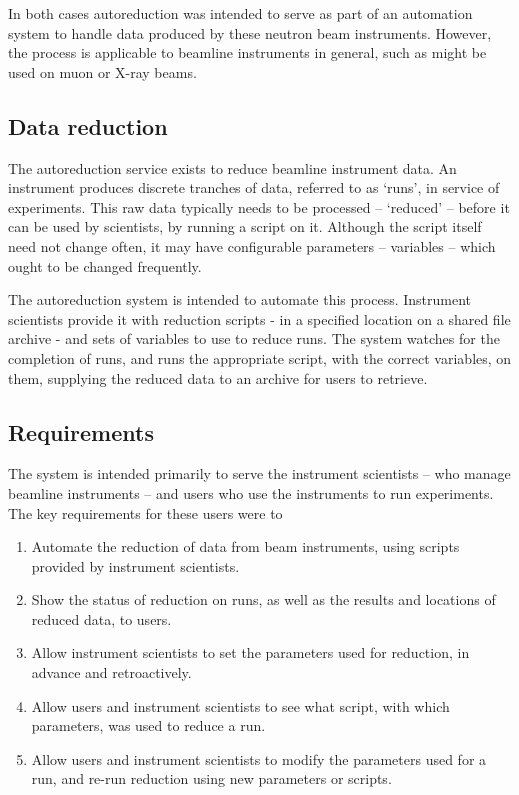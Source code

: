\documentclass[twocolumn]{article}
\begin{document}
In both cases autoreduction was intended to serve as part of an
automation system to handle data produced by these neutron beam
instruments. However, the process is applicable to beamline instruments
in general, such as might be used on muon or X-ray beams.

\subsection{Data reduction}\label{data-reduction}

The autoreduction service exists to reduce beamline instrument data. An
instrument produces discrete tranches of data, referred to as `runs', in
service of experiments. This raw data typically needs to be processed --
`reduced' -- before it can be used by scientists, by running a script on
it. Although the script itself need not change often, it may have
configurable parameters -- variables -- which ought to be changed
frequently.

The autoreduction system is intended to automate this process.
Instrument scientists provide it with reduction scripts - in a specified
location on a shared file archive - and sets of variables to use to
reduce runs. The system watches for the completion of runs, and runs the
appropriate script, with the correct variables, on them, supplying the
reduced data to an archive for users to retrieve.

\subsection{Requirements}\label{requirements}

The system is intended primarily to serve the instrument scientists --
who manage beamline instruments -- and users who use the instruments to
run experiments. The key requirements for these users were to

\begin{enumerate}[noitemsep]
\item
  Automate the reduction of data from beam instruments, using scripts
  provided by instrument scientists.
\item
  Show the status of reduction on runs, as well as the results and
  locations of reduced data, to users.
\item
  Allow instrument scientists to set the parameters used for reduction,
  in advance and retroactively.
\item
  Allow users and instrument scientists to see what script, with which
  parameters, was used to reduce a run.
\item
  Allow users and instrument scientists to modify the parameters used
  for a run, and re-run reduction using new parameters or scripts.
\end{enumerate}
\end{document}
